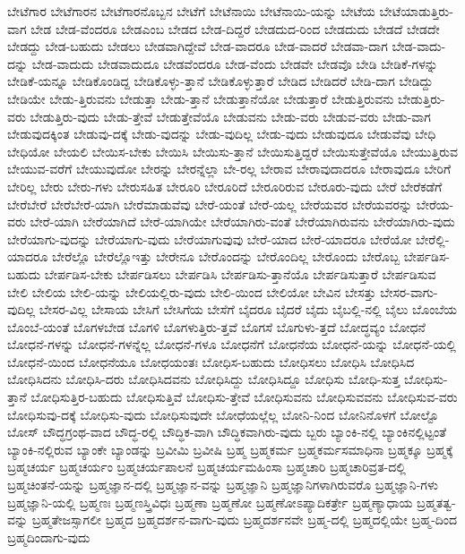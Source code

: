 {ಬೇಟೆಗಾರ
ಬೇಟೆಗಾರನ
ಬೇಟೆಗಾರನೊಬ್ಬನ
ಬೇಟೆಗೆ
ಬೇಟೆನಾಯಿ
ಬೇಟೆನಾಯಿ-ಯನ್ನು
ಬೇಟೆಯ
ಬೇಟೆಯಾಡುತ್ತಿರು-ವಾಗ
ಬೇಡ
ಬೇಡ-ವೆಂದರೂ
ಬೇಡಎಂಬ
ಬೇಡದ
ಬೇಡ-ದಿದ್ದರೆ
ಬೇಡದುದ-ರಿಂದ
ಬೇಡದುದು
ಬೇಡದೆ
ಬೇಡದೇ
ಬೇಡದ್ದು
ಬೇಡ-ಬಹುದು
ಬೇಡಲು
ಬೇಡವಾಗಿದ್ದೇವೆ
ಬೇಡ-ವಾದರೂ
ಬೇಡ-ವಾದರೆ
ಬೇಡವಾ-ದಾಗ
ಬೇಡ-ವಾದು-ದನ್ನು
ಬೇಡ-ವಾದುದು
ಬೇಡವಾದುದೂ
ಬೇಡವೆಂದರೂ
ಬೇಡ-ವೆಂದು
ಬೇಡವೇ
ಬೇಡವೊ
ಬೇಡಿ
ಬೇಡಿಕೆ-ಗಳನ್ನು
ಬೇಡಿಕೆ-ಯನ್ನೂ
ಬೇಡಿಕೊಂಡಿದ್ದ
ಬೇಡಿಕೊಳ್ಳು-ತ್ತಾನೆ
ಬೇಡಿಕೊಳ್ಳುತ್ತಾರೆ
ಬೇಡಿದ
ಬೇಡಿದರೆ
ಬೇಡಿ-ದಾಗ
ಬೇಡಿದ್ದು
ಬೇಡಿಯೇ
ಬೇಡು-ತ್ತಿರುವನು
ಬೇಡುತ್ತಾ
ಬೇಡು-ತ್ತಾನೆ
ಬೇಡುತ್ತಾನೆಯೋ
ಬೇಡುತ್ತಾರೆ
ಬೇಡುತ್ತಿರುವನು
ಬೇಡುತ್ತಿರು-ವರು
ಬೇಡುತ್ತಿರು-ವುದು
ಬೇಡು-ತ್ತೇವೆ
ಬೇಡುತ್ತೇವೆಯೊ
ಬೇಡುವನು
ಬೇಡು-ವರು
ಬೇಡುವ-ವರು
ಬೇಡು-ವಾಗ
ಬೇಡುವುದಕ್ಕಿಂತ
ಬೇಡುವು-ದಕ್ಕೆ
ಬೇಡು-ವುದನ್ನು
ಬೇಡು-ವುದಿಲ್ಲ
ಬೇಡು-ವುದು
ಬೇಡುವುದೂ
ಬೇಡುವೆವು
ಬೇಧಿ
ಬೇಧಿಯೋ
ಬೇಯಲಿ
ಬೇಯಿಸ-ಬೇಕು
ಬೇಯಿಸಿ
ಬೇಯಿಸು-ತ್ತಾನೆ
ಬೇಯಿಸುತ್ತಿದ್ದರೆ
ಬೇಯಿಸುತ್ತೇವೆಯೊ
ಬೇಯುತ್ತಿರುವ
ಬೇಯುವ-ವರೆಗೆ
ಬೇಯುವುದೋ
ಬೇರನ್ನು
ಬೇರನ್ನೆಲ್ಲಾ
ಬೇ-ರಲ್ಲ
ಬೇರಾವ
ಬೇರಾವುದಾದರೂ
ಬೇರಾವುದೂ
ಬೇರಿಗೆ
ಬೇರಿಲ್ಲ
ಬೇರು
ಬೇರು-ಗಳು
ಬೇರುಸಹಿತ
ಬೇರೂರಿ
ಬೇರೂರಿದೆ
ಬೇರೂರಿರುವ
ಬೇರೂರು-ವುದು
ಬೇರೆ
ಬೇರೆಕಡೆಗೆ
ಬೇರೆಬೇರೆ
ಬೇರೆಬೇರೆ-ಯಾಗಿ
ಬೇರೆಮಾಡುವೆವು
ಬೇರೆ-ಯಂತೆ
ಬೇರೆ-ಯಲ್ಲ
ಬೇರೆಯವರ
ಬೇರೆಯವರನ್ನು
ಬೇರೆಯ-ವರು
ಬೇರೆ-ಯಾಗಿ
ಬೇರೆಯಾಗಿದೆ
ಬೇರೆ-ಯಾಗಿಯೇ
ಬೇರೆಯಾಗಿರು-ವಂತೆ
ಬೇರೆಯಾಗಿರುವನು
ಬೇರೆಯಾಗಿರು-ವುದು
ಬೇರೆಯಾಗು-ವುದನ್ನು
ಬೇರೆಯಾಗು-ವುದು
ಬೇರೆಯಾಗುವುವು
ಬೇರೆ-ಯಾದ
ಬೇರೆ-ಯಾದರೂ
ಬೇರೆಯೋ
ಬೇರೆಲ್ಲಿ-ಯಾದರೂ
ಬೇರೆಲ್ಲೊ
ಬೇರೆಲ್ಲೊಇತ್ತು
ಬೇರೇನೂ
ಬೇರೊಂದನ್ನು
ಬೇರೊಂದಿಲ್ಲ
ಬೇರೊಂದು
ಬೇರೊಬ್ಬ
ಬೇರ್ಪಡಿಸ-ಬಹುದು
ಬೇರ್ಪಡಿಸ-ಬೇಕು
ಬೇರ್ಪಡಿಸಲು
ಬೇರ್ಪಡಿಸಿ
ಬೇರ್ಪಡಿಸು-ತ್ತಾನೆಯೊ
ಬೇರ್ಪಡಿಸುತ್ತಾರೆ
ಬೇರ್ಪಡಿಸುವ
ಬೇಲಿ
ಬೇಲಿಯ
ಬೇಲಿ-ಯನ್ನು
ಬೇಲಿಯಲ್ಲಿರು-ವುದು
ಬೇಲಿ-ಯಿಂದ
ಬೇಲಿಯೋ
ಬೇವಿನ
ಬೇಸತ್ತು
ಬೇಸರ-ವಾಗು-ವುದಿಲ್ಲ
ಬೇಸರ-ವಿಲ್ಲ
ಬೇಸಾಯ
ಬೇಸಿಗೆ
ಬೇಸಿಗೆಯ
ಬೇಸೆಗೆ
ಬೈದರೂ
ಬೈದರೆ
ಬೈದು
ಬೈಬಲ್ಲಿ-ನಲ್ಲಿ
ಬೈಲು
ಬೊಂಬೆಯ
ಬೊಂಬೆ-ಯಂತೆ
ಬೊಗಳಬೇಡ
ಬೊಗಳಿ
ಬೊಗಳುತ್ತಿರು-ತ್ತವೆ
ಬೊಗಸೆ
ಬೊಗುಳು-ತ್ತದೆ
ಬೋದ್ಧವ್ಯಂ
ಬೋಧನೆ
ಬೋಧನೆ-ಗಳನ್ನು
ಬೋಧನೆ-ಗಳನ್ನೆಲ್ಲ
ಬೋಧನೆ-ಗಳೂ
ಬೋಧನೆಗೆ
ಬೋಧನೆಯ
ಬೋಧನೆ-ಯನ್ನು
ಬೋಧನೆ-ಯಲ್ಲಿ
ಬೋಧನೆ-ಯಿಂದ
ಬೋಧನೆಯೂ
ಬೋಧಯಂತಃ
ಬೋಧಿಸ-ಬಹುದು
ಬೋಧಿಸಲು
ಬೋಧಿಸಿ
ಬೋಧಿಸಿದ
ಬೋಧಿಸಿದನು
ಬೋಧಿಸಿ-ದರು
ಬೋಧಿಸಿದವನು
ಬೋಧಿಸಿದ್ದು
ಬೋಧಿಸಿದ್ದೂ
ಬೋಧಿಸು
ಬೋಧಿ-ಸುತ್ತ
ಬೋಧಿಸು-ತ್ತಾನೆ
ಬೋಧಿಸುತ್ತಿರ-ಬಹುದು
ಬೋಧಿಸುತ್ತಿವೆ
ಬೋಧಿಸು-ತ್ತೇವೆ
ಬೋಧಿಸುವನು
ಬೋಧಿಸುವವನು
ಬೋಧಿಸುವ-ವರು
ಬೋಧಿಸುವು-ದಕ್ಕೆ
ಬೋಧಿಸು-ವುದು
ಬೋಧಿಸುವುದೇ
ಬೋಧೆಯಲ್ಲೆಲ್ಲ
ಬೋನಿ-ನಿಂದ
ಬೋನಿನೊಳಗೆ
ಬೋಲ್ಟೊ
ಬೋಸ್
ಬೌದ್ಧಗ್ರಂಥ-ವಾದ
ಬೌದ್ಧ-ರಲ್ಲಿ
ಬೌದ್ಧಿಕ-ವಾಗಿ
ಬೌದ್ಧಿಕವಾಗಿರು-ವುದು
ಬ್ಬರು
ಬ್ಯಾಂಕಿ-ನಲ್ಲಿ
ಬ್ಯಾಂಕಿನಲ್ಲಿಟ್ಟಂತೆ
ಬ್ಯಾಂಕಿ-ನಲ್ಲಿರುವ
ಬ್ಯಾಂಕೇ
ಬ್ಯಾಂಡನ್ನು
ಬ್ರವೀಮಿ
ಬ್ರವೀಷಿ
ಬ್ರಹ್ಮ
ಬ್ರಹ್ಮಕರ್ಮ
ಬ್ರಹ್ಮಕರ್ಮಸಮಾಧಿನಾ
ಬ್ರಹ್ಮಕ್ಕೂ
ಬ್ರಹ್ಮಕ್ಕೆ
ಬ್ರಹ್ಮಚರ್ಯ
ಬ್ರಹ್ಮಚರ್ಯಂ
ಬ್ರಹ್ಮಚರ್ಯಪಾಲನೆ
ಬ್ರಹ್ಮಚರ್ಯಮಹಿಂಸಾ
ಬ್ರಹ್ಮಚಾರಿ
ಬ್ರಹ್ಮಚಾರಿವ್ರತ-ದಲ್ಲಿ
ಬ್ರಹ್ಮಚಿಂತನೆ-ಯನ್ನು
ಬ್ರಹ್ಮಜ್ಞಾನ-ದಲ್ಲಿ
ಬ್ರಹ್ಮಜ್ಞಾನ-ವನ್ನು
ಬ್ರಹ್ಮಜ್ಞಾನಿ
ಬ್ರಹ್ಮಜ್ಞಾನಿಗಳಾಗಿರುವರೊ
ಬ್ರಹ್ಮಜ್ಞಾನಿ-ಗಳು
ಬ್ರಹ್ಮಜ್ಞಾನಿ-ಯಲ್ಲಿ
ಬ್ರಹ್ಮಣಃ
ಬ್ರಹ್ಮಣಸ್ತ್ರಿವಿಧಃ
ಬ್ರಹ್ಮಣಾ
ಬ್ರಹ್ಮಣೋ
ಬ್ರಹ್ಮಣೋಽಪ್ಯಾದಿಕರ್ತ್ರೇ
ಬ್ರಹ್ಮಣ್ಯಾಧಾಯ
ಬ್ರಹ್ಮತತ್ವ-ವನ್ನು
ಬ್ರಹ್ಮತೇಜಸ್ಸಾಗಲೀ
ಬ್ರಹ್ಮದ
ಬ್ರಹ್ಮದರ್ಶನ-ವಾಗು-ವುದು
ಬ್ರಹ್ಮದರ್ಶನವೇ
ಬ್ರಹ್ಮ-ದಲ್ಲಿ
ಬ್ರಹ್ಮದಲ್ಲಿಯೇ
ಬ್ರಹ್ಮ-ದಿಂದ
ಬ್ರಹ್ಮದಿಂದಾಗು-ವುದು
}
